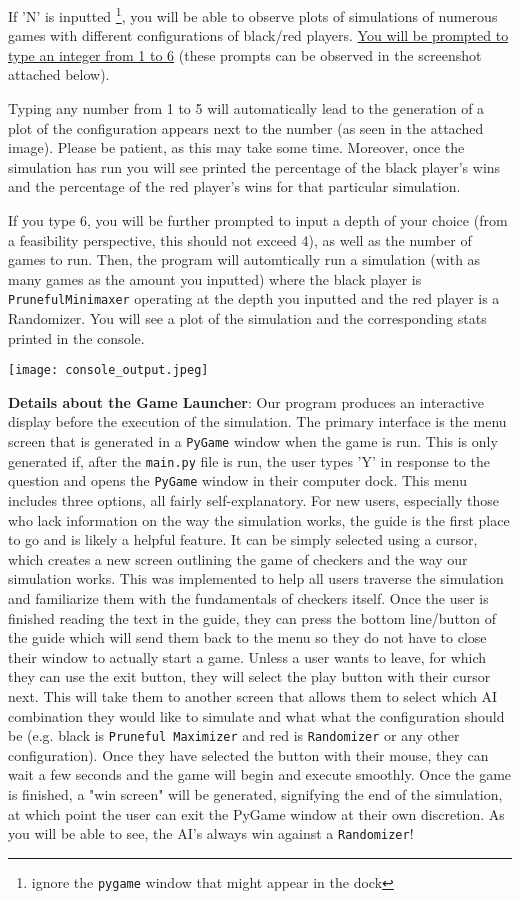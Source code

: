 \documentclass[fontsize=11pt]{article}
\begin{document}
If 'N' is inputted \footnote{ignore the \texttt{pygame} window that might appear in the dock}, you will be able to observe plots of simulations of numerous games with different configurations of black/red players. \underline{You will be prompted to type an integer from 1 to 6} (these prompts can be observed in the screenshot attached below). 

Typing any number from 1 to 5 will automatically lead to the generation of a plot of the configuration appears next to the number (as seen in the attached image). Please be patient, as this may take some time. Moreover, once the simulation has run you will see printed the percentage of the black player's wins and the percentage of the red player's wins for that particular simulation.

If you type 6, you will be further prompted to input a depth of your choice (from a feasibility perspective, this should not exceed 4), as well as the number of games to run. Then, the program will automtically run a simulation (with as many games as the amount you inputted) where the black player is \texttt{PrunefulMinimaxer} operating at the depth you inputted and the red player is a Randomizer. You will see a plot of the simulation and the corresponding stats printed in the console.

 {\texttt{[image: console\_output.jpeg]}}


\textbf{Details about the Game Launcher}:
 Our program produces an interactive display before the execution of the simulation. The primary interface is the menu screen that is generated in a \texttt{PyGame} window when the game is run. This is only generated if, after the \texttt{main.py} file is run, the user types 'Y' in response to the question and opens the \texttt{PyGame} window in their computer dock. This menu includes three options, all fairly self-explanatory. For new users, especially those who lack information on the way the simulation works, the guide is the first place to go and is likely a helpful feature. It can be simply selected using a cursor, which creates a new screen outlining the game of checkers and the way our simulation works. This was implemented to help all users traverse the simulation and familiarize them with the fundamentals of checkers itself. Once the user is finished reading the text in the guide, they can press the bottom line/button of the guide which will send them back to the menu so they do not have to close their window to actually start a game. Unless a user wants to leave, for which they can use the exit button, they will select the play button with their cursor next. This will take them to another screen that allows them to select which AI combination they would like to simulate and what what the configuration should be (e.g. black is \texttt{Pruneful Maximizer} and red is \texttt{Randomizer} or any other configuration). Once they have selected the button with their mouse, they can wait a few seconds and the game will begin and execute smoothly. Once the game is finished, a "win screen" will be generated, signifying the end of the simulation, at which point the user can exit the PyGame window at their own discretion. As you will be able to see, the AI's always win against a \texttt{Randomizer}!
\end{document}

